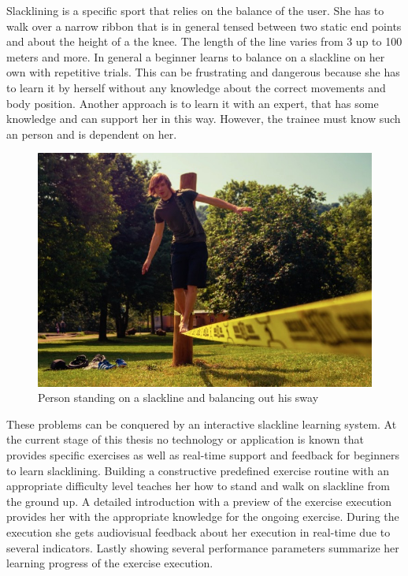 Slacklining is a specific sport that relies on the balance of the user. She has to walk over a narrow ribbon that is in general tensed between two static end points and about the height of a the knee. The length of the line varies from 3 up to 100 meters and more. In general a beginner learns to balance on a slackline on her own with repetitive trials. This can be frustrating and dangerous because she has to learn it by herself without any knowledge about the correct movements and body position. Another approach is to learn it with an expert, that has some knowledge and can support her in this way. However, the trainee must know such an person and is dependent on her.
\begin{figure}[htb]
	\centering
	\begin{minipage}[t]{1\linewidth}
		\centering
		\includegraphics[width=0.7\linewidth]{Pictures/1_slackline}
		\caption{Person standing on a slackline and balancing out his sway}
		\label{fig:1_slackline}
	\end{minipage}
\end{figure}

These problems can be conquered by an interactive slackline learning system. At the current stage of this thesis no technology or application is known that provides specific exercises as well as real-time support and feedback for beginners to learn slacklining. Building a constructive predefined exercise routine with an appropriate difficulty level teaches her how to stand and walk on slackline from the ground up. A detailed introduction with a preview of the exercise execution provides her with the appropriate knowledge for the ongoing exercise. During the execution she gets audiovisual feedback about her execution in real-time due to several indicators. Lastly showing several performance parameters summarize her learning progress of the exercise execution.



